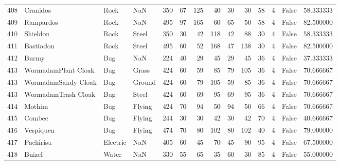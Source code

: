 \begin{tabular}{rlllrrrrrrrrlr}
 408 &                   Cranidos &      Rock &       NaN &    350 &   67 &     125 &       40 &       30 &       30 &     58 &           4 &      False &   58.333333 \\
 409 &                  Rampardos &      Rock &       NaN &    495 &   97 &     165 &       60 &       65 &       50 &     58 &           4 &      False &   82.500000 \\
 410 &                   Shieldon &      Rock &     Steel &    350 &   30 &      42 &      118 &       42 &       88 &     30 &           4 &      False &   58.333333 \\
 411 &                  Bastiodon &      Rock &     Steel &    495 &   60 &      52 &      168 &       47 &      138 &     30 &           4 &      False &   82.500000 \\
 412 &                      Burmy &       Bug &       NaN &    224 &   40 &      29 &       45 &       29 &       45 &     36 &           4 &      False &   37.333333 \\
 413 &        WormadamPlant Cloak &       Bug &     Grass &    424 &   60 &      59 &       85 &       79 &      105 &     36 &           4 &      False &   70.666667 \\
 413 &        WormadamSandy Cloak &       Bug &    Ground &    424 &   60 &      79 &      105 &       59 &       85 &     36 &           4 &      False &   70.666667 \\
 413 &        WormadamTrash Cloak &       Bug &     Steel &    424 &   60 &      69 &       95 &       69 &       95 &     36 &           4 &      False &   70.666667 \\
 414 &                     Mothim &       Bug &    Flying &    424 &   70 &      94 &       50 &       94 &       50 &     66 &           4 &      False &   70.666667 \\
 415 &                     Combee &       Bug &    Flying &    244 &   30 &      30 &       42 &       30 &       42 &     70 &           4 &      False &   40.666667 \\
 416 &                  Vespiquen &       Bug &    Flying &    474 &   70 &      80 &      102 &       80 &      102 &     40 &           4 &      False &   79.000000 \\
 417 &                  Pachirisu &  Electric &       NaN &    405 &   60 &      45 &       70 &       45 &       90 &     95 &           4 &      False &   67.500000 \\
 418 &                     Buizel &     Water &       NaN &    330 &   55 &      65 &       35 &       60 &       30 &     85 &           4 &      False &   55.000000 \\

\end{tabular}
